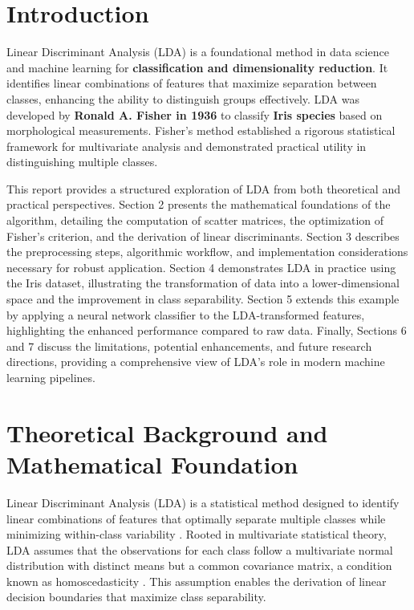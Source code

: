 \documentclass[12pt,a4paper]{article}
\begin{document}
\tableofcontents
\newpage

\section{Introduction}

Linear Discriminant Analysis (LDA) is a foundational method in data science and machine learning for \textbf{classification and dimensionality reduction}. It identifies linear combinations of features that maximize separation between classes, enhancing the ability to distinguish groups effectively. LDA was developed by \textbf{Ronald A. Fisher in 1936} to classify \textbf{Iris species} based on morphological measurements. Fisher's method established a rigorous statistical framework for multivariate analysis and demonstrated practical utility in distinguishing multiple classes.\par

This report provides a structured exploration of LDA from both theoretical and practical perspectives. Section 2 presents the mathematical foundations of the algorithm, detailing the computation of scatter matrices, the optimization of Fisher’s criterion, and the derivation of linear discriminants. Section 3 describes the preprocessing steps, algorithmic workflow, and implementation considerations necessary for robust application. Section 4 demonstrates LDA in practice using the Iris dataset, illustrating the transformation of data into a lower-dimensional space and the improvement in class separability. Section 5 extends this example by applying a neural network classifier to the LDA-transformed features, highlighting the enhanced performance compared to raw data. Finally, Sections 6 and 7 discuss the limitations, potential enhancements, and future research directions, providing a comprehensive view of LDA’s role in modern machine learning pipelines.\par


\section{Theoretical Background and Mathematical Foundation}

Linear Discriminant Analysis (LDA) is a statistical method designed to identify linear combinations of features that optimally separate multiple classes while minimizing within-class variability \cite{fisher1936use}. Rooted in multivariate statistical theory, LDA assumes that the observations for each class follow a multivariate normal distribution with distinct means but a common covariance matrix, a condition known as homoscedasticity \cite{hastie2009elements}. This assumption enables the derivation of linear decision boundaries that maximize class separability.\par
\end{document}
